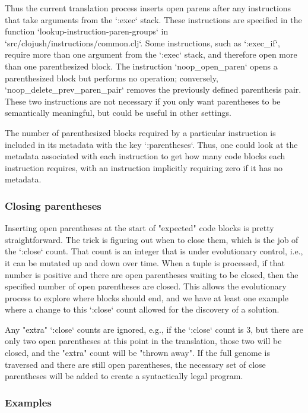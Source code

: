 Thus the current translation process inserts open parens after any instructions that take arguments from the `:exec` stack. These instructions are specified in the function `lookup-instruction-paren-groups` in `src/clojush/instructions/common.clj`. Some instructions, such as `:exec\_if`, require more than one argument from the `:exec` stack, and therefore open more than one parenthesized block. The instruction `noop\_open\_paren` opens a parenthesized block but performs no operation; conversely, `noop\_delete\_prev\_paren\_pair` removes the previously defined parenthesis pair. These two instructions are not necessary if you only want parentheses to be semantically meaningful, but could be useful in other settings.

The number of parenthesized blocks required by a particular instruction is included in its metadata with the key `:parentheses`. Thus, one could look at the metadata associated with each instruction to get how many code blocks each instruction requires, with an instruction implicitly requiring zero if it has no metadata.

\subsubsection{ Closing parentheses}

Inserting open parentheses at the start of "expected" code blocks is pretty straightforward. The trick is figuring out when to close them, which is the job of the `:close` count. That count is an integer that is under evolutionary control, i.e., it can be mutated up and down over time. When a tuple is processed, if that number is positive and there are open parentheses waiting to be closed, then the specified number of open parentheses are closed. This allows the evolutionary process to explore where blocks should end, and we have at least one example where a change to this `:close` count allowed for the discovery of a solution.

Any "extra" `:close` counts are ignored, e.g., if the `:close` count is 3, but there are only two open parentheses at this point in the translation, those two will be closed, and the "extra" count will be "thrown away". If the full genome is traversed and there are still open parentheses, the necessary set of close parentheses will be added to create a syntactically legal program.

\subsubsection{ Examples}


